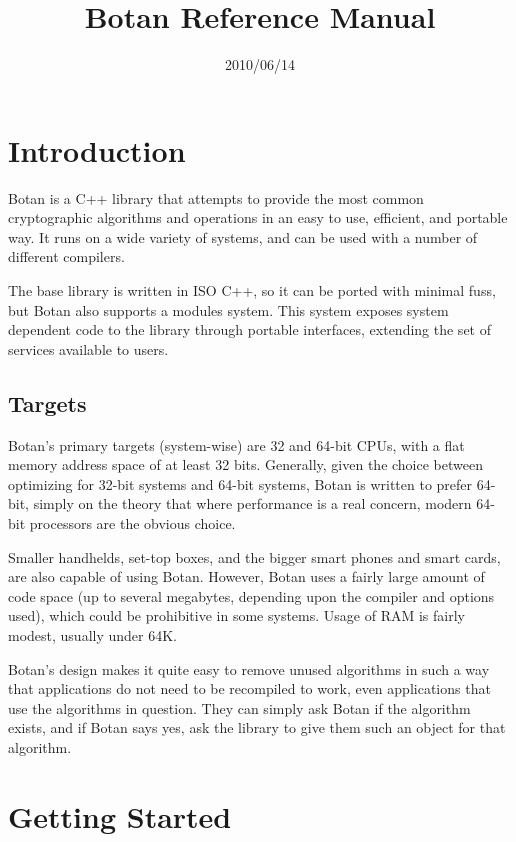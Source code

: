 \documentclass{article}
\title{\textbf{Botan Reference Manual}}
\author{}
\date{2010/06/14}
\begin{document}
\maketitle

\tableofcontents

\parskip=5pt

\pagebreak

\section{Introduction}

Botan is a C++ library that attempts to provide the most common
cryptographic algorithms and operations in an easy to use, efficient,
and portable way. It runs on a wide variety of systems, and can be
used with a number of different compilers.

The base library is written in ISO C++, so it can be ported with
minimal fuss, but Botan also supports a modules system. This system
exposes system dependent code to the library through portable
interfaces, extending the set of services available to users.

\subsection{Targets}

Botan's primary targets (system-wise) are 32 and 64-bit CPUs, with a
flat memory address space of at least 32 bits. Generally, given the
choice between optimizing for 32-bit systems and 64-bit systems, Botan
is written to prefer 64-bit, simply on the theory that where
performance is a real concern, modern 64-bit processors are the
obvious choice.

Smaller handhelds, set-top boxes, and the bigger smart phones and smart
cards, are also capable of using Botan. However, Botan uses a fairly
large amount of code space (up to several megabytes, depending upon
the compiler and options used), which could be prohibitive in some
systems. Usage of RAM is fairly modest, usually under 64K.

Botan's design makes it quite easy to remove unused algorithms in such
a way that applications do not need to be recompiled to work, even
applications that use the algorithms in question. They can simply ask
Botan if the algorithm exists, and if Botan says yes, ask the library
to give them such an object for that algorithm.

\pagebreak
\section{Getting Started}
\end{document}
